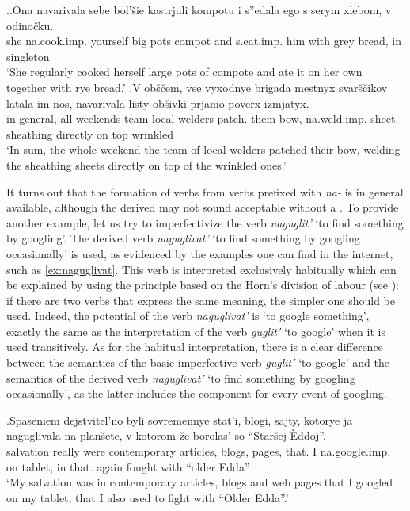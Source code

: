 \ex.\ag.\label{ex:navarivat2}Ona navarivala sebe bol'\v{s}ie kastrjuli kompotu i s''edala ego s serym xlebom, v odino\v{c}ku.\\
she na.cook.imp. yourself big pots compot and s.eat.imp. him with grey bread, in singleton\\
\trans `She regularly cooked herself large pots of compote and ate it on her own together with rye bread.'
\bg.\label{ex:navarivat1}V ob\v{s}\v{c}em, vse vyxodnye brigada mestnyx svar\v{s}\v{c}ikov latala im nos, navarivala listy ob\v{s}ivki prjamo poverx izmjatyx.\\
in general, all weekends team local welders patch. them bow, na.weld.imp. sheet. sheathing directly {on top} wrinkled\\
\trans `In sum, the whole weekend the team of local welders patched their bow, welding the sheathing sheets directly on top of the wrinkled ones.'

It turns out that the formation of  verbs from verbs prefixed with  \textit{na-} is in general available, although the derived  may not sound acceptable without a . To provide another example, let us try to imperfectivize the verb \textit{naguglit'} `to find something by googling'. The derived verb \textit{naguglivat'} `to find something by googling occasionally' is used, as evidenced by the examples one can find in the internet, such as \ref{ex:naguglivat}. This verb is interpreted exclusively habitually which can be explained by using the principle based on the Horn's division of labour (see \citealt{Horn:84}): if there are two verbs that express the same meaning, the simpler one should be used. Indeed, the potential  of the verb \textit{naguglivat'} is `to google something', exactly the same as the interpretation of the verb \textit{guglit'} `to google' when it is used transitively. As for the habitual interpretation, there is a clear difference between the semantics of the basic imperfective verb \textit{guglit'} `to google' and the semantics of the derived  verb \textit{naguglivat'} `to find something by googling occasionally', as the latter includes the  component for every event of googling. 

\exg.\label{ex:naguglivat}Spaseniem dejstvitel'no byli sovremennye stat'i, blogi, sajty, kotorye ja naguglivala na plan\v{s}ete, v kotorom \v{z}e borolas' so ``Star\v{s}ej \`{E}ddoj''.\\
salvation really were contemporary articles, blogs, pages, that. I na.google.imp. on tablet, in that. again fought with ``older Edda''\\
\trans `My salvation was in contemporary articles, blogs and web pages that I googled on my tablet, that I also used to fight with ``Older Edda''.'\\


